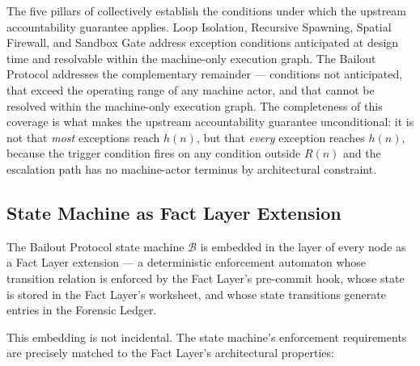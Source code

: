 The five pillars of \bxthree{} collectively establish the conditions under which the upstream accountability guarantee applies. Loop Isolation, Recursive Spawning, Spatial Firewall, and Sandbox Gate address exception conditions anticipated at design time and resolvable within the machine-only execution graph. The Bailout Protocol addresses the complementary remainder --- conditions not anticipated, that exceed the operating range of any machine actor, and that cannot be resolved within the machine-only execution graph. The completeness of this coverage is what makes the upstream accountability guarantee unconditional: it is not that \emph{most} exceptions reach $h(n)$, but that \emph{every} exception reaches $h(n)$, because the trigger condition fires on any condition outside $R(n)$ and the escalation path has no machine-actor terminus by architectural constraint.

\subsection{State Machine as Fact Layer Extension}\label{sec:state-machine-fact-layer}

The Bailout Protocol state machine $\mathcal{B}$ is embedded in the \fact{} layer of every \bxthree{} node as a Fact Layer extension --- a deterministic enforcement automaton whose transition relation is enforced by the Fact Layer's pre-commit hook, whose state is stored in the Fact Layer's worksheet, and whose state transitions generate entries in the Forensic Ledger.

This embedding is not incidental. The state machine's enforcement requirements are precisely matched to the Fact Layer's architectural properties:

